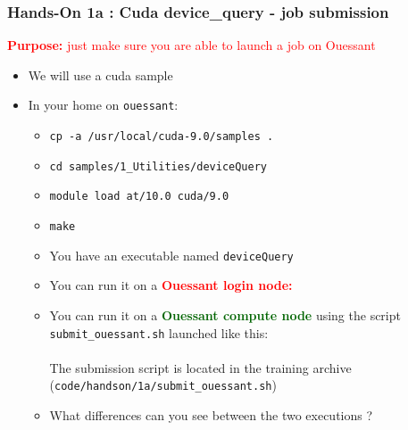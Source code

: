 \begin{frame}
  \frametitle{Hands-On 1a : Cuda device\_query - job submission}

  {\large\textcolor{red}{\textbf{Purpose:} just make sure you are able to launch a job on Ouessant}}

  \begin{itemize}
  \item We will use a cuda sample
  \item In your home on \texttt{ouessant}: 
    \begin{itemize}
    \item \texttt{cp -a /usr/local/cuda-9.0/samples .}
    \item \texttt{cd samples/1\_Utilities/deviceQuery}
    \item \texttt{module load at/10.0 cuda/9.0}
    \item \texttt{make}
    \item You have an executable named \texttt{deviceQuery}
    \item You can run it on a \textcolor{red}{\bf Ouessant login node:} 
    \item You can run it on a \textcolor{darkgreen}{\bf Ouessant compute node} using the script \texttt{submit\_ouessant.sh} launched like this:\\
      \\
      The submission script is located in the training archive (\texttt{code/handson/1a/submit\_ouessant.sh})
    \item What differences can you see between the two executions ?
    \end{itemize}
  \end{itemize}

\end{frame}


